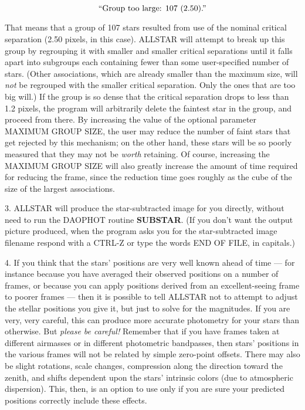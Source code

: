 $$\hbox{\rm ``Group too large:  107 (2.50).''}$$

\item{} That means that a group of 107 stars resulted from use of the
nominal critical separation (2.50 pixels, in this case).  ALLSTAR will
attempt to break up this group by regrouping it with smaller and
smaller critical separations until it falls apart into subgroups each
containing fewer than some user-specified number of stars.  (Other
associations, which are already smaller than the maximum size, will
{\it not\/} be regrouped with the smaller critical separation.  Only
the ones that are too big will.)  If the group is so dense that the
critical separation drops to less than 1.2 pixels, the program will
arbitrarily delete the faintest star in the group, and proceed from
there.  By increasing the value of the optional parameter MAXIMUM GROUP
SIZE, the user may reduce the number of faint stars that get rejected
by this mechanism; on the other hand, these stars will be so poorly
measured that they may not be {\it worth\/} retaining.  Of course,
increasing the MAXIMUM GROUP SIZE will also greatly increase the amount
of time required for reducing the frame, since the reduction time goes
roughly as the cube of the size of the largest associations.

\item{3.} ALLSTAR will produce the star-subtracted image for you
directly, without need to run the DAOPHOT routine {\bf SUBSTAR}.  (If
you don't want the output picture produced, when the program asks you
for the star-subtracted image filename respond with a CTRL-Z or type
the words END OF FILE, in capitals.)

\item{4.} If you think that the stars' positions are very well known
ahead of time --- for instance because you have averaged their observed
positions on a number of frames, or because you can apply positions
derived from an excellent-seeing frame to poorer frames --- then it is
possible to tell ALLSTAR not to attempt to adjust the stellar
positions you give it, but just to solve for the magnitudes.  If you
are very, very careful, this can produce more accurate photometry for
your stars than otherwise.  But {\it please be careful!\/} Remember
that if you have frames taken at different airmasses or in different
photometric bandpasses, then stars' positions in the various frames
will not be related by simple zero-point offsets.  There may also be
slight rotations, scale changes, compression along the direction toward
the zenith, and shifts dependent upon the stars' intrinsic colors (due
to atmospheric dispersion). This, then, is an option to use only if you
are sure your predicted positions correctly include these effects.

